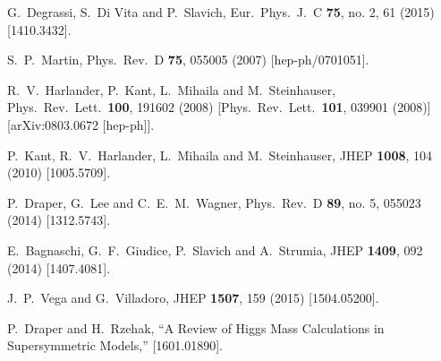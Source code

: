 \documentclass[11pt]{article}
\begin{document}
\begin{thebibliography}{999}
  G.~Degrassi, S.~Di Vita and P.~Slavich,
  Eur.\ Phys.\ J.\ C {\bf 75}, no. 2, 61 (2015)
  [1410.3432].

  S.~P.~Martin,
  Phys.\ Rev.\ D {\bf 75}, 055005 (2007)
  [hep-ph/0701051].

  R.~V.~Harlander, P.~Kant, L.~Mihaila and M.~Steinhauser,
  Phys.\ Rev.\ Lett.\  {\bf 100}, 191602 (2008)
  [Phys.\ Rev.\ Lett.\  {\bf 101}, 039901 (2008)]
  [arXiv:0803.0672 [hep-ph]].

  P.~Kant, R.~V.~Harlander, L.~Mihaila and M.~Steinhauser,
  JHEP {\bf 1008}, 104 (2010)
  [1005.5709].

  P.~Draper, G.~Lee and C.~E.~M.~Wagner,
  Phys.\ Rev.\ D {\bf 89}, no. 5, 055023 (2014)
  [1312.5743].

  E.~Bagnaschi, G.~F.~Giudice, P.~Slavich and A.~Strumia,
  JHEP {\bf 1409}, 092 (2014)
  [1407.4081].
  
  J.~P.~Vega and G.~Villadoro,
  JHEP {\bf 1507}, 159 (2015)
  [1504.05200].
    
  P.~Draper and H.~Rzehak,
  ``A Review of Higgs Mass Calculations in Supersymmetric Models,''
  [1601.01890].



\end{thebibliography}
\end{document}
